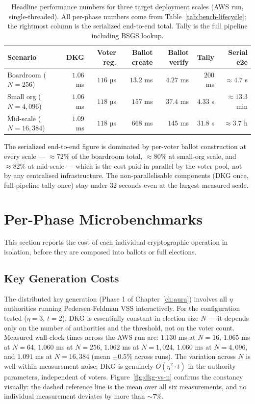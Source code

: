 \documentclass[12pt,a4paper,oneside]{report}
\begin{document}
\begin{table}[H]
\centering
\caption{Headline performance numbers for three target deployment
scales (AWS run, single-threaded). All per-phase numbers come from
Table~\ref{tab:bench-lifecycle}; the rightmost column is the
serialized end-to-end total. Tally is the full pipeline including
BSGS lookup.}
\label{tab:bench-headline}
\small
\begin{tabular}{lrrrrrr}
\toprule
Scenario & DKG & Voter reg. & Ballot create & Ballot verify & Tally & Serial e2e \\
\midrule
Boardroom ($N = 256$)        & $1.06$ ms & $116$ µs & $13.2$ ms & $4.27$ ms & $200$ ms  & $\approx 4.7$ s   \\
Small org ($N = 4{,}096$)    & $1.06$ ms & $118$ µs & $157$ ms  & $37.4$ ms & $4.33$ s  & $\approx 13.3$ min \\
Mid-scale ($N = 16{,}384$)   & $1.09$ ms & $118$ µs & $668$ ms  & $145$ ms  & $31.8$ s  & $\approx 3.7$ h    \\
\bottomrule
\end{tabular}
\end{table}

The serialized end-to-end figure is dominated by per-voter ballot
construction at every scale --- $\approx 72\%$ of the boardroom
total, $\approx 80\%$ at small-org scale, and $\approx 82\%$ at
mid-scale --- which is the cost paid in parallel by the voter pool,
not by any centralised infrastructure. The non-parallelisable
components (DKG once, full-pipeline tally once) stay under $32$
seconds even at the largest measured scale.

\section{Per-Phase Microbenchmarks}
\label{sec:bench-microbenchmarks}

This section reports the cost of each individual cryptographic operation
in isolation, before they are composed into ballots or full elections.

\subsection{Key Generation Costs}
\label{sec:bench-dkg}

The distributed key generation (Phase 1 of Chapter~\ref{ch:aura}) involves 
all $\eta$ authorities running Pedersen-Feldman VSS interactively. For 
the configuration tested ($\eta = 3$, $t = 2$), DKG is essentially 
constant in election size $N$ --- it depends only on the number of 
authorities and the threshold, not on the voter count. Measured
wall-clock times across the AWS run are:
$1.130$ ms at $N = 16$, $1.065$ ms at $N = 64$, $1.060$ ms at $N = 256$,
$1.062$ ms at $N = 1{,}024$, $1.060$ ms at $N = 4{,}096$, and
$1.091$ ms at $N = 16{,}384$ (mean $\pm 0.5\%$ across runs). The
variation across $N$ is well within measurement noise; DKG is
genuinely $O(\eta^2 \cdot t)$ in the authority parameters, independent
of voters. Figure~\ref{fig:dkg-vs-n} confirms the constancy visually:
the dashed reference line is the mean over all six measurements, and
no individual measurement deviates by more than $\sim 7\%$.
\end{document}
